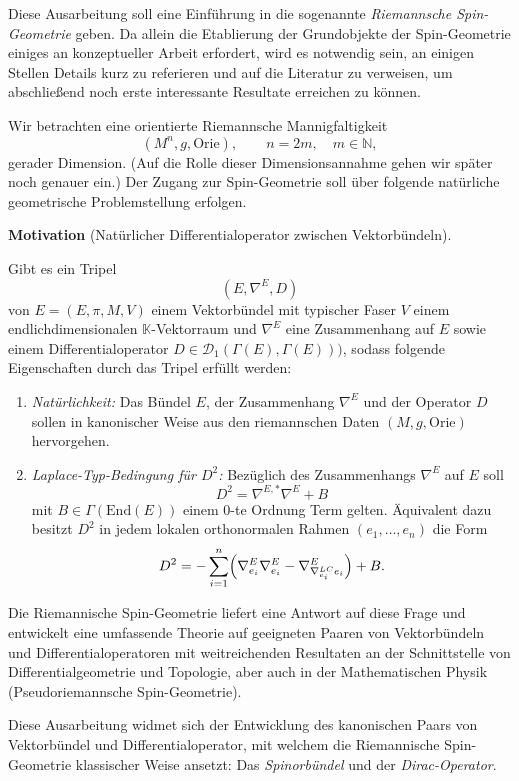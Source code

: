 \documentclass[10pt, letterpaper]{article}
\newcommand{\End}{\mathrm{End}}
\newcommand{\CustomHeading}[3]{%
  \par\medskip\noindent%
  \textbf{#1 #2} \textnormal{(#3)}.\enskip%
}
\newenvironment{MOT}[2]{\CustomHeading{Motivation}{#1}{#2}}{}
\begin{document}
Diese Ausarbeitung soll eine Einführung in die sogenannte \emph{Riemannsche Spin-Geometrie} geben. Da allein die Etablierung der Grundobjekte der Spin-Geometrie einiges an konzeptueller Arbeit erfordert, wird es notwendig sein, an einigen Stellen Details kurz zu referieren und auf die Literatur zu verweisen, um abschließend noch erste interessante Resultate erreichen zu können. 


Wir betrachten eine orientierte Riemannsche Mannigfaltigkeit
\[
(M^n,g,\mathrm{Orie}),
\qquad n=2m,\quad m\in\mathbb N,
\]
gerader Dimension. 
(Auf die Rolle dieser Dimensionsannahme gehen wir später noch genauer ein.) Der Zugang zur Spin-Geometrie soll über folgende natürliche geometrische Problemstellung erfolgen.

\begin{MOT}{}{Natürlicher Differentialoperator zwischen Vektorbündeln}
  Gibt es ein Tripel 
  $$\left( E,\nabla^E, D \right)$$
  von $E=(E,\pi,M,V)$ einem Vektorbündel mit typischer Faser $V$ einem endlichdimensionalen $\mathbb{K}$-Vektorraum und $\nabla^E$ eine Zusammenhang auf $E$ sowie einem Differentialoperator $D\in \mathscr{D}_1(\Gamma(E),\Gamma(E)))$, sodass folgende Eigenschaften durch das Tripel erfüllt werden:
  \begin{enumerate}
    \item \emph{Natürlichkeit:}
    Das Bündel $E$, der Zusammenhang $\nabla^E$ und der Operator $D$ sollen
    in kanonischer Weise aus den riemannschen Daten $(M,g,\mathrm{Orie})$
    hervorgehen.
    \item \emph{Laplace-Typ-Bedingung für $D^2$:}
    Bezüglich des Zusammenhangs $\nabla^E$ auf $E$ soll 
    \[
    D^2=\nabla^{E,*}\nabla^E+B
    \]
    mit $B\in \Gamma(\End(E))$ einem 0-te Ordnung Term gelten. Äquivalent dazu besitzt $D^2$ in jedem lokalen orthonormalen Rahmen
    $(e_1,\dots,e_n)$ die Form
    \[
    D^2
    =
    -\sum_{i=1}^n\Bigl(
    \nabla^E_{e_i}\nabla^E_{e_i}
    -\nabla^E_{\nabla^{LC}_{e_i}e_i}
    \Bigr)
    +B.
    \]
  \end{enumerate}
\end{MOT}
\bigskip 

Die Riemannische Spin-Geometrie liefert eine Antwort auf diese Frage und entwickelt eine umfassende Theorie auf geeigneten Paaren von Vektorbündeln und Differentialoperatoren mit weitreichenden Resultaten an der Schnittstelle von Differentialgeometrie und Topologie, aber auch in der Mathematischen Physik (Pseudoriemannsche Spin-Geometrie).


Diese Ausarbeitung widmet sich der Entwicklung des kanonischen Paars von Vektorbündel und Differentialoperator, mit welchem die Riemannische Spin-Geometrie klassischer Weise ansetzt: Das \emph{Spinorbündel} und der \emph{Dirac-Operator}.  
\end{document}
